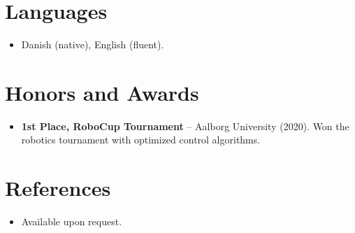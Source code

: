 \documentclass[11pt,a4paper,sans]{moderncv}
\begin{document}
\section{Languages}
\vspace{1pt}
\begin{itemize}
\item Danish (native), English (fluent).
\end{itemize}


\section{Honors and Awards}
\vspace{1pt}
\begin{itemize}
\item{\textbf{1st Place, RoboCup Tournament} -- Aalborg University (2020). Won the robotics tournament with optimized control algorithms.}
\end{itemize}


\section{References}
\vspace{1pt}
\begin{itemize}
\item{Available upon request.}
\end{itemize}
\end{document}
